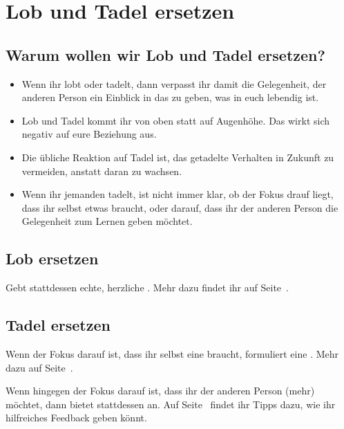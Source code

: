 \section{Lob und Tadel ersetzen}
\label{lob-tadel}

\subsection{Warum wollen wir Lob und Tadel ersetzen?}

\begin{itemize}
  \item Wenn ihr lobt oder tadelt, dann verpasst ihr damit die Gelegenheit, der anderen Person ein Einblick in das zu geben, was in euch lebendig ist.
  \item Lob und Tadel kommt ihr von oben statt auf Augenhöhe. Das wirkt sich negativ auf eure Beziehung aus.
  \item Die übliche Reaktion auf Tadel ist, das getadelte Verhalten in Zukunft zu vermeiden, anstatt daran zu wachsen.
  \item Wenn ihr jemanden tadelt, ist nicht immer klar, ob der Fokus drauf liegt, dass ihr selbst etwas braucht, oder darauf, dass ihr der anderen Person die Gelegenheit zum Lernen geben möchtet.
\end{itemize}


\subsection{Lob ersetzen}

Gebt stattdessen echte, herzliche . Mehr dazu findet ihr auf Seite~\pageref{wertschaetzung}.


\subsection{Tadel ersetzen}

Wenn der Fokus darauf ist, dass ihr selbst eine  braucht, formuliert eine . Mehr dazu auf Seite~\pageref{bitten}.

Wenn hingegen der Fokus darauf ist, dass ihr der anderen Person (mehr)  möchtet, dann bietet stattdessen  an. Auf Seite~\pageref{feedback-regeln} findet ihr Tipps dazu, wie ihr hilfreiches Feedback geben könnt.

